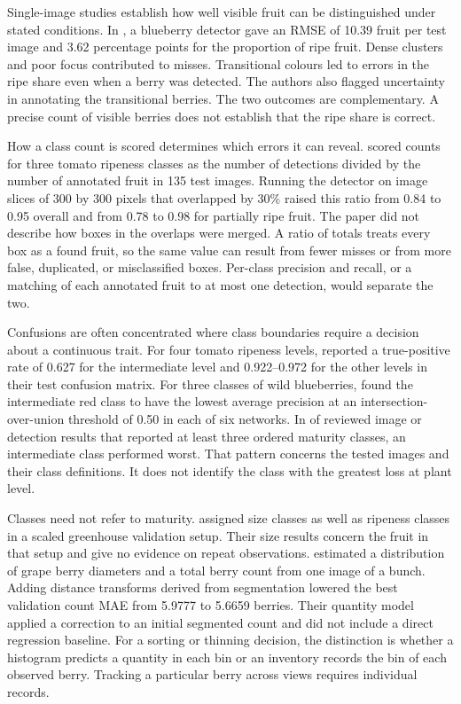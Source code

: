 Single-image studies establish how well visible fruit can be distinguished under stated conditions. In \citet{deng2024detection}, a blueberry detector gave an RMSE of 10.39 fruit per test image and 3.62 percentage points for the proportion of ripe fruit. Dense clusters and poor focus contributed to misses. Transitional colours led to errors in the ripe share even when a berry was detected. The authors also flagged uncertainty in annotating the transitional berries. The two outcomes are complementary. A precise count of visible berries does not establish that the ripe share is correct.

How a class count is scored determines which errors it can reveal. \citet{khiem2026approach} scored counts for three tomato ripeness classes as the number of detections divided by the number of annotated fruit in 135 test images. Running the detector on image slices of 300 by 300 pixels that overlapped by 30\% raised this ratio from 0.84 to 0.95 overall and from 0.78 to 0.98 for partially ripe fruit. The paper did not describe how boxes in the overlaps were merged. A ratio of totals treats every box as a found fruit, so the same value can result from fewer misses or from more false, duplicated, or misclassified boxes. Per-class precision and recall, or a matching of each annotated fruit to at most one detection, would separate the two.

Confusions are often concentrated where class boundaries require a decision about a continuous trait. For four tomato ripeness levels, \citet{pisharody2025precise} reported a true-positive rate of 0.627 for the intermediate level and 0.922--0.972 for the other levels in their test confusion matrix. For three classes of wild blueberries, \citet{maceachern2023detection} found the intermediate red class to have the lowest average precision at an intersection-over-union threshold of 0.50 in each of six networks. In \nKelasLainTengah of \nKelasLain reviewed image or detection results that reported at least three ordered maturity classes, an intermediate class performed worst. That pattern concerns the tested images and their class definitions. It does not identify the class with the greatest loss at plant level.

Classes need not refer to maturity. \citet{chiu2025remote} assigned size classes as well as ripeness classes in a scaled greenhouse validation setup. Their size results concern the fruit in that setup and give no evidence on repeat observations. \citet{soto2026monocular} estimated a distribution of grape berry diameters and a total berry count from one image of a bunch. Adding distance transforms derived from segmentation lowered the best validation count MAE from 5.9777 to 5.6659 berries. Their quantity model applied a correction to an initial segmented count and did not include a direct regression baseline. For a sorting or thinning decision, the distinction is whether a histogram predicts a quantity in each bin or an inventory records the bin of each observed berry. Tracking a particular berry across views requires individual records.

